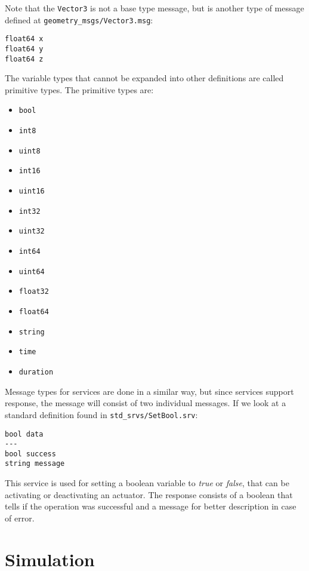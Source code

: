 Note that the \texttt{Vector3} is not a base type message, but is another type of message defined at \texttt{geometry\_msgs/Vector3.msg}:

\begin{lstlisting}
float64 x
float64 y
float64 z
\end{lstlisting}

The variable types that cannot be expanded into other definitions are called primitive types. The primitive types are:

\begin{multicols}{3}
    \begin{itemize}
        \item \texttt{bool}
        \item \texttt{int8}
        \item \texttt{uint8}
        \item \texttt{int16}
        \item \texttt{uint16}
        \item \texttt{int32}
        \item \texttt{uint32}
        \item \texttt{int64}
        \item \texttt{uint64}
        \item \texttt{float32}
        \item \texttt{float64}
        \item \texttt{string}
        \item \texttt{time}
        \item \texttt{duration}
    \end{itemize}
\end{multicols}

Message types for services are done in a similar way, but since services support response, the message will consist of two individual messages. If we look at a standard definition found in \texttt{std\_srvs/SetBool.srv}:

\begin{lstlisting}
bool data
---
bool success
string message
\end{lstlisting}

This service is used for setting a boolean variable to \textit{true} or \textit{false}, that can be activating or deactivating an actuator. The response consists of a boolean that tells if the operation was successful and a message for better description in case of error.

\section{Simulation}


